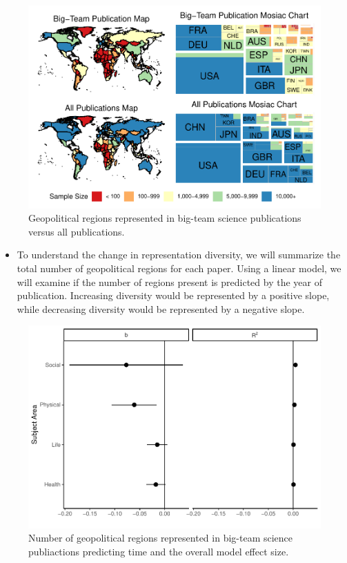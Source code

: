 \documentclass[
  man]{apa7}
\providecommand{\tightlist}{%
  \setlength{\itemsep}{0pt}\setlength{\parskip}{0pt}}
\begin{document}
\begin{figure}
\centering
\includegraphics{manuscript_scopus_files/figure-latex/fig-map-both-1.pdf}
\caption{\label{fig:fig-map-both}Geopolitical regions represented in big-team science publications versus all publications.}
\end{figure}

\begin{itemize}
\tightlist
\item
  To understand the change in representation diversity, we will
  summarize the total number of geopolitical regions for each paper.
  Using a linear model, we will examine if the number of regions
  present is predicted by the year of publication. Increasing
  diversity would be represented by a positive slope, while decreasing
  diversity would be represented by a negative slope.
\end{itemize}

\begin{figure}
\centering
\includegraphics{manuscript_scopus_files/figure-latex/fig-diversity-1.pdf}
\caption{\label{fig:fig-diversity}Number of geopolitical regions represented in big-team science publiactions predicting time and the overall model effect size.}
\end{figure}
\end{document}
